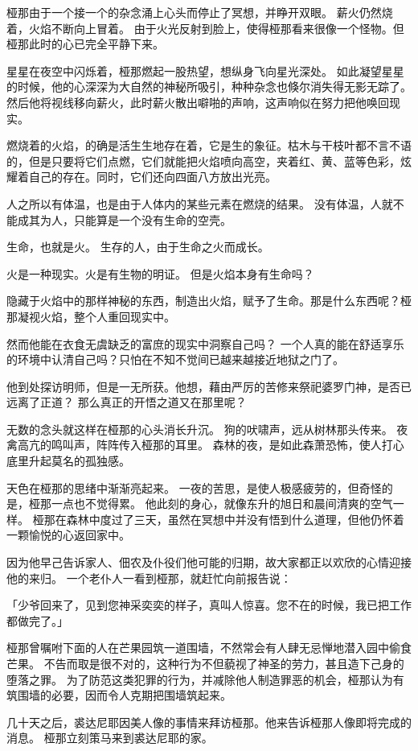 \documentclass[twoside,openany]{book}
\begin{document}
桠那由于一个接一个的杂念涌上心头而停止了冥想，并睁开双眼。
薪火仍然烧着，火焰不断向上冒着。
由于火光反射到脸上，使得桠那看来很像一个怪物。但桠那此时的心已完全平静下来。

星星在夜空中闪烁着，桠那燃起一股热望，想纵身飞向星光深处。
如此凝望星星的时候，他的心深深为大自然的神秘所吸引，种种杂念也倏尔消失得无影无踪了。
然后他将视线移向薪火，此时薪火散出噼啪的声响，这声响似在努力把他唤回现实。

燃烧着的火焰，的确是活生生地存在着，它是生的象征。枯木与干枝叶都不言不语的，但是只要将它们点燃，它们就能把火焰喷向高空，夹着红、黄、蓝等色彩，炫耀着自己的存在。同时，它们还向四面八方放出光亮。

人之所以有体温，也是由于人体内的某些元素在燃烧的结果。
没有体温，人就不能成其为人，只能算是一个没有生命的空壳。

生命，也就是火。
生存的人，由于生命之火而成长。

火是一种现实。火是有生物的明证。
但是火焰本身有生命吗？

隐藏于火焰中的那样神秘的东西，制造出火焰，赋予了生命。那是什么东西呢？桠那凝视火焰，整个人重回现实中。

然而他能在衣食无虞缺乏的富庶的现实中洞察自己吗？
一个人真的能在舒适享乐的环境中认清自己吗？只怕在不知不觉间已越来越接近地狱之门了。

他到处探访明师，但是一无所获。他想，藉由严厉的苦修来祭祀婆罗门神，是否已远离了正道？
那么真正的开悟之道又在那里呢？

无数的念头就这样在桠那的心头消长升沉。
狗的吠啸声，远从树林那头传来。
夜禽高亢的鸣叫声，阵阵传入桠那的耳里。
森林的夜，是如此森萧恐怖，使人打心底里升起莫名的孤独感。

天色在桠那的思绪中渐渐亮起来。
一夜的苦思，是使人极感疲劳的，但奇怪的是，桠那一点也不觉得累。
他此刻的身心，就像东升的旭日和晨间清爽的空气一样。
桠那在森林中度过了三天，虽然在冥想中并没有悟到什么道理，但他仍怀着一颗愉悦的心返回家中。

因为他早己告诉家人、佃农及仆役们他可能的归期，故大家都正以欢欣的心情迎接他的来归。
一个老仆人一看到桠那，就赶忙向前报告说：

「少爷回来了，见到您神采奕奕的样子，真叫人惊喜。您不在的时候，我已把工作都做完了。」

桠那曾嘱咐下面的人在芒果园筑一道围墙，不然常会有人肆无忌惮地潜入园中偷食芒果。
不告而取是很不对的，这种行为不但藐视了神圣的劳力，甚且造下己身的堕落之罪。
为了防范这类犯罪的行为，并减除他人制造罪恶的机会，桠那认为有筑围墙的必要，因而令人克期把围墙筑起来。

几十天之后，裘达尼耶因美人像的事情来拜访桠那。他来告诉桠那人像即将完成的消息。
桠那立刻策马来到裘达尼耶的家。
\end{document}
